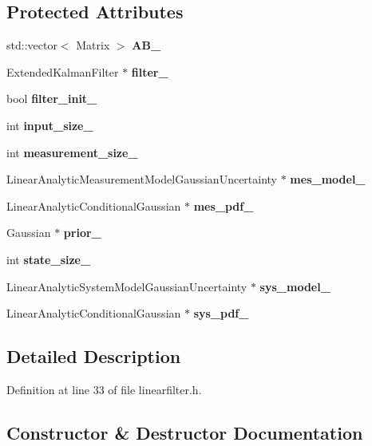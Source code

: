 \subsection*{\-Protected \-Attributes}
\begin{DoxyCompactItemize}
\item 
std\-::vector$<$ \-Matrix $>$ {\bf \-A\-B\-\_\-}
\item 
\-Extended\-Kalman\-Filter $\ast$ {\bf filter\-\_\-}
\item 
bool {\bf filter\-\_\-init\-\_\-}
\item 
int {\bf input\-\_\-size\-\_\-}
\item 
int {\bf measurement\-\_\-size\-\_\-}
\item 
\-Linear\-Analytic\-Measurement\-Model\-Gaussian\-Uncertainty $\ast$ {\bf mes\-\_\-model\-\_\-}
\item 
\-Linear\-Analytic\-Conditional\-Gaussian $\ast$ {\bf mes\-\_\-pdf\-\_\-}
\item 
\-Gaussian $\ast$ {\bf prior\-\_\-}
\item 
int {\bf state\-\_\-size\-\_\-}
\item 
\-Linear\-Analytic\-System\-Model\-Gaussian\-Uncertainty $\ast$ {\bf sys\-\_\-model\-\_\-}
\item 
\-Linear\-Analytic\-Conditional\-Gaussian $\ast$ {\bf sys\-\_\-pdf\-\_\-}
\end{DoxyCompactItemize}


\subsection{\-Detailed \-Description}


\-Definition at line 33 of file linearfilter.\-h.



\subsection{\-Constructor \& \-Destructor \-Documentation}
